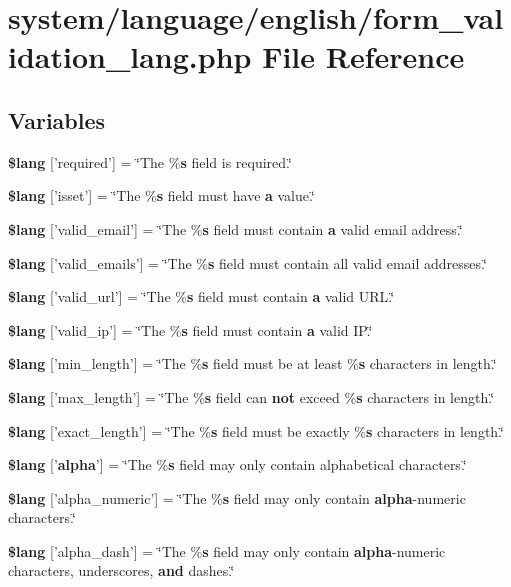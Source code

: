 \section{system/language/english/form\-\_\-validation\-\_\-lang.php File Reference}
\label{form__validation__lang_8php}
\subsection*{Variables}
\begin{DoxyCompactItemize}
\item 
{\bf \$lang} ['required'] = \char`\"{}The \%{\bf s} field is required.\char`\"{}
\item 
{\bf \$lang} ['isset'] = \char`\"{}The \%{\bf s} field must have {\bf a} value.\char`\"{}
\item 
{\bf \$lang} ['valid\-\_\-email'] = \char`\"{}The \%{\bf s} field must contain {\bf a} valid email address.\char`\"{}
\item 
{\bf \$lang} ['valid\-\_\-emails'] = \char`\"{}The \%{\bf s} field must contain all valid email addresses.\char`\"{}
\item 
{\bf \$lang} ['valid\-\_\-url'] = \char`\"{}The \%{\bf s} field must contain {\bf a} valid U\-R\-L.\char`\"{}
\item 
{\bf \$lang} ['valid\-\_\-ip'] = \char`\"{}The \%{\bf s} field must contain {\bf a} valid I\-P.\char`\"{}
\item 
{\bf \$lang} ['min\-\_\-length'] = \char`\"{}The \%{\bf s} field must be at least \%{\bf s} characters in length.\char`\"{}
\item 
{\bf \$lang} ['max\-\_\-length'] = \char`\"{}The \%{\bf s} field can {\bf not} exceed \%{\bf s} characters in length.\char`\"{}
\item 
{\bf \$lang} ['exact\-\_\-length'] = \char`\"{}The \%{\bf s} field must be exactly \%{\bf s} characters in length.\char`\"{}
\item 
{\bf \$lang} ['{\bf alpha}'] = \char`\"{}The \%{\bf s} field may only contain alphabetical characters.\char`\"{}
\item 
{\bf \$lang} ['alpha\-\_\-numeric'] = \char`\"{}The \%{\bf s} field may only contain {\bf alpha}-\/numeric characters.\char`\"{}
\item 
{\bf \$lang} ['alpha\-\_\-dash'] = \char`\"{}The \%{\bf s} field may only contain {\bf alpha}-\/numeric characters, underscores, {\bf and} dashes.\char`\"{}

\end{DoxyCompactItemize}
